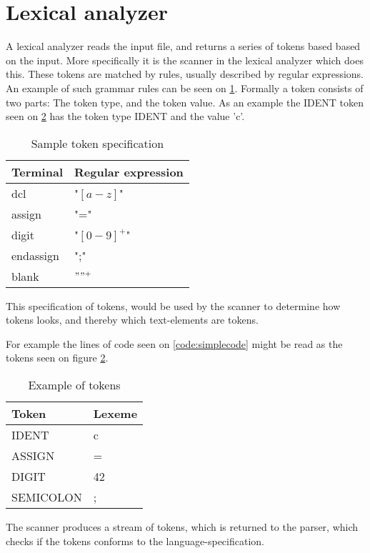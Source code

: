 


\section{Lexical analyzer}
A lexical analyzer reads the input file, and returns a series of tokens based based on the input. More specifically it is the scanner in the lexical analyzer which does this. These tokens are matched by rules, usually described by regular expressions. An example of such grammar rules can be seen on \ref{tab:tokenspecification}. Formally a token consists of two parts: The token type, and the token value. As an example the IDENT token seen on \ref{tab:tokensexample} has the token type IDENT and the value 'c'. 

\begin{table}[H]
\begin{tabular}{|l|l|}
\hline
    	Terminal  	& Regular expression 	\\ \hline
    	dcl       	& "$[a-z]$"      			\\ 
    	assign    	& "="      				\\ 
    	digit     	& "$[0-9]^+$"   			\\ 
    	endassign 	& ";"      				\\
    	blank 		& $" "^+$					\\
    \hline
\end{tabular}
\caption{Sample token specification}
\label{tab:tokenspecification}
\end{table}
This specification of tokens, would be used by the scanner to determine how tokens looks, and thereby which text-elements are tokens. 


For example the lines of code seen on \ref{code:simplecode} might be read as the tokens seen on figure \ref{tab:tokensexample}.
\begin{table}[H]
\begin{tabular}{|l|l|}
\hline
    Token     & Lexeme \\ \hline
    IDENT     & c      \\ 
    ASSIGN    & =      \\ 
    DIGIT     & 42     \\ 
    SEMICOLON & ;      \\
    \hline
\end{tabular}
\caption{Example of tokens}
\label{tab:tokensexample}
\end{table}
The scanner produces a stream of tokens, which is returned to the parser, which checks if the tokens conforms to the language-specification.
